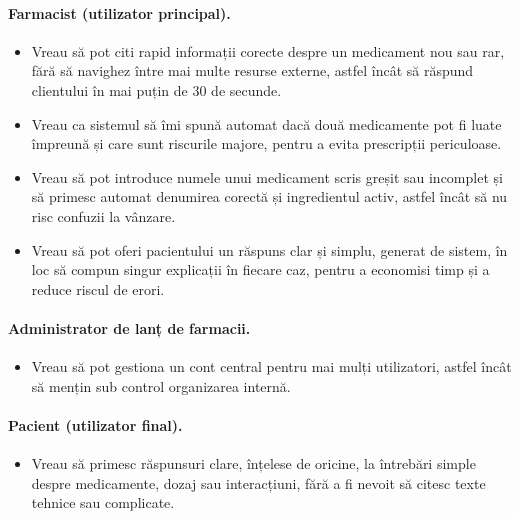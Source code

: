 \paragraph{Farmacist (utilizator principal).}
\begin{itemize}
    \item Vreau să pot citi rapid informații corecte despre un medicament nou sau rar, fără să navighez între mai multe resurse externe, astfel încât să răspund clientului în mai puțin de 30 de secunde.
    \item Vreau ca sistemul să îmi spună automat dacă două medicamente pot fi luate împreună și care sunt riscurile majore, pentru a evita prescripții periculoase.
    \item Vreau să pot introduce numele unui medicament scris greșit sau incomplet și să primesc automat denumirea corectă și ingredientul activ, astfel încât să nu risc confuzii la vânzare.
    \item Vreau să pot oferi pacientului un răspuns clar și simplu, generat de sistem, în loc să compun singur explicații în fiecare caz, pentru a economisi timp și a reduce riscul de erori.
\end{itemize}

\paragraph{Administrator de lanț de farmacii.}
\begin{itemize}
    \item Vreau să pot gestiona un cont central pentru mai mulți utilizatori, astfel încât să mențin sub control organizarea internă.
\end{itemize}

\paragraph{Pacient (utilizator final).}
\begin{itemize}
    \item Vreau să primesc răspunsuri clare, înțelese de oricine, la întrebări simple despre medicamente, dozaj sau interacțiuni, fără a fi nevoit să citesc texte tehnice sau complicate.
\end{itemize}

